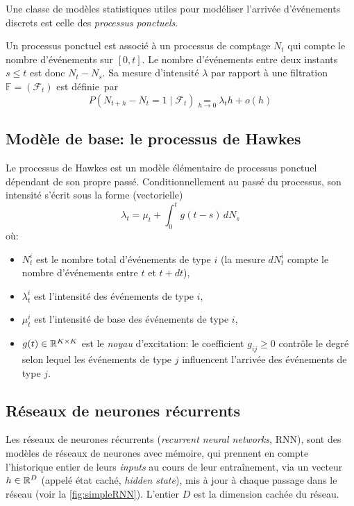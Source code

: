 \documentclass[../main.tex]{subfiles}
\begin{document}
Une classe de modèles statistiques utiles pour modéliser l'arrivée d'événements discrets est celle des \textit{processus ponctuels}.

Un processus ponctuel est associé à un processus de comptage $N_t$ qui compte le nombre d'événements sur $[0,t]$. Le nombre d'événements entre deux instants $s\leq t$ est donc $N_t - N_s$. Sa mesure d'intensité $\lambda$ par rapport à une filtration $\mathds F = (\mathcal{F}_t)$ est définie\footnotemark~par
\[
	P(N_{t+h} - N_t = 1\mid \mathcal{F}_t) \underset{h\to 0}{=} \lambda_th + o(h)
\]

\subsection{Modèle de base: le processus de Hawkes}

Le processus de Hawkes est un modèle élémentaire de processus ponctuel dépendant de son propre passé. Conditionnellement au passé du processus, son intensité s'écrit sous la forme (vectorielle)
\begin{equation}
\lambda_t = \mu_t + \int_0^t g(t-s)\,dN_s
\end{equation}
où:\begin{itemize}
	\item $N^i_t$ est le nombre total d'événements de type $i$ (la mesure $dN^i_t$ compte le nombre d'événements entre $t$ et $t+dt$),
	\item $\lambda_t^i$ est l'intensité des événements de type $i$,
	\item $\mu^i_t$ est l'intensité de base des événements de type $i$,
	\item $g(t) \in \mathbb{R}^{K\times K}$ est le \textit{noyau} d'excitation: le coefficient $g_{ij} \geq 0$ contrôle le degré selon lequel les événements de type $j$ influencent l'arrivée des événements de type $j$.
\end{itemize} 

\subsection{Réseaux de neurones récurrents}

Les réseaux de neurones récurrents (\textit{recurrent neural networks}, RNN), sont des modèles de réseaux de neurones avec mémoire, qui prennent en compte l'historique entier de leurs \textit{inputs} au cours de leur entraînement, via un vecteur $h\in\mathbb{R}^D$ (appelé état caché, \textit{hidden state}), mis à jour à chaque passage dans le réseau (voir la \autoref{fig:simpleRNN}). L'entier $D$ est la dimension cachée du réseau.
\end{document}
